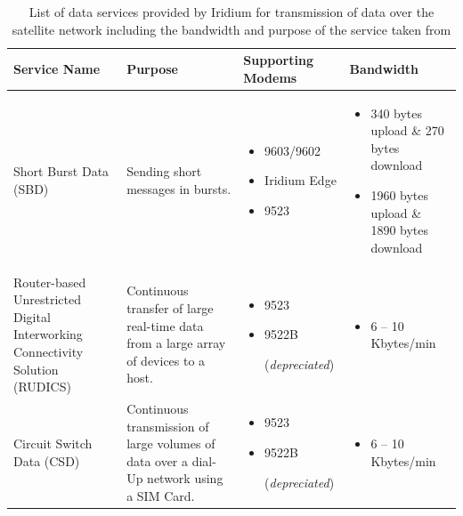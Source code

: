 \begin{table}[H]
    \centering
    \caption{ List of data services provided by Iridium for transmission of data over the satellite network including the bandwidth and purpose of the service taken from \cite{iridium_mobile}}
    \label{tab:iridium service}
     \vspace{2.5mm}
    \begin{tabular}{|>{\RaggedRight}m{}|>{\RaggedRight}m{}| >{\RaggedRight}m{}| >{\RaggedRight}m{}|}
    \hline
    \textbf{Service Name} & \textbf{Purpose}& \textbf{Supporting Modems} & \textbf{Bandwidth}\\
    \hline
    Short Burst Data (SBD) & Sending short messages in bursts. & 
    \begin{itemize}
        \item 9603/9602
        \item Iridium Edge
        \item 9523
    \end{itemize}&
    \begin{itemize}
        \item 340 bytes upload \& 270 bytes download
        \item 1960 bytes upload \& 1890 bytes download
    \end{itemize} \\
    \hline
    Router-based Unrestricted Digital Interworking Connectivity Solution (RUDICS) & Continuous transfer of large real-time data from a large array of devices to a host. &
    \begin{itemize}
        \item 9523
        \item 9522B \par (\textit{depreciated})
    \end{itemize} &
    \begin{itemize}
        \item 6 – 10 Kbytes/min
    \end{itemize}\\
    \hline
    Circuit Switch Data (CSD) & Continuous transmission of large volumes of data over a dial-Up network using a SIM Card.& 
     \begin{itemize}
        \item 9523
        \item 9522B \par (\textit{depreciated})
    \end{itemize} &
    \begin{itemize}
        \item 6 – 10 Kbytes/min
    \end{itemize}\\
    \hline
    \end{tabular}
\end{table}

